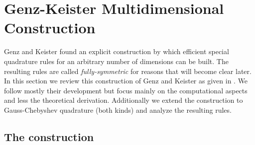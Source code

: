 \documentclass[a4paper,10pt]{article}
\begin{document}
\FloatBarrier
\section{Genz-Keister Multidimensional Construction}


Genz and Keister found an explicit construction by which efficient
special quadrature rules for an arbitrary number
of dimensions can be built. The resulting rules are
called \emph{fully-symmetric} for reasons that will become
clear later. In this section we review this construction of Genz
and Keister as given in \cite{genz, genz_keister}. We follow mostly their
development but focus mainly on the computational aspects and less
the theoretical derivation. Additionally we extend the construction
to Gauss-Chebyshev quadrature (both kinds) and analyze the resulting rules.


\subsection{The construction}
\end{document}
